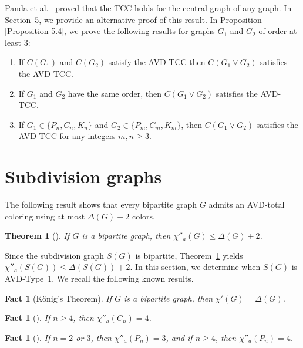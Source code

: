 \documentclass[12pt,reqno,a4paper]{amsart}
\theoremstyle{definition}
\theoremstyle{plain}
\newtheorem{thm}[defn]{Theorem}
\newtheorem{fact}[defn]{Fact}
\begin{document}
Panda et al.~\cite{PVK2020} proved that the TCC holds for the central graph of any graph. 
In Section~5, we provide an alternative proof of this result. In Proposition \ref{Proposition 5.4}, 
we prove the following results for graphs $G_1$ and $G_2$ of order at least 3:

\begin{enumerate}
    \item If $C(G_{1})$ and $C(G_{2})$ satisfy the AVD-TCC then $C(G_{1} \vee G_{2})$ satisfies the AVD-TCC.
    \item If $G_{1}$ and $G_{2}$ have the same order, then $C(G_{1} \vee G_{2})$ satisfies the AVD-TCC.
    \item If $G_{1}\in\{P_{n},C_{n},K_{n}\}$ and
    $G_{2}\in\{P_{m},C_{m},K_{m}\}$, then
    $C(G_{1}\vee G_{2})$ satisfies the AVD-TCC for any integers $m,n\geq3$.
\end{enumerate}


\section{Subdivision graphs}
The following result shows that every bipartite graph $G$ admits an AVD-total coloring using at most $\Delta(G)+2$ colors.

\begin{thm}[{\cite[Proposition 1.1]{Che2008}}]\label{Theorem 2.1}
If $G$ is a bipartite graph, then $\chi''_{a}(G)\leq \Delta(G) + 2$.
\end{thm}

Since the subdivision graph $S(G)$ is bipartite, Theorem~\ref{Theorem 2.1} yields
$\chi''_{a}(S(G)) \leq \Delta(S(G)) + 2$.
In this section, we determine when $S(G)$ is AVD-Type~1.
We recall the following known results.

\begin{fact}[K\"{o}nig's Theorem]\label{Fact 2.2}
If $G$ is a bipartite graph, then $\chi'(G) = \Delta(G)$.
\end{fact}

\begin{fact}[{\cite[Theorem 2.1]{ZCYLW2005}}]\label{Fact 2.3}
If $n \geq 4$, then $\chi''_{a}(C_n) = 4$.
\end{fact}

\begin{fact}[{\cite[Lemma 2.1]{ZCYLW2005}}]\label{Fact 2.4}
If $n = 2$ or $3$, then $\chi''_{a}(P_n) = 3$, and if $n \geq 4$, then $\chi''_{a}(P_n) = 4$.
\end{fact}
\end{document}
